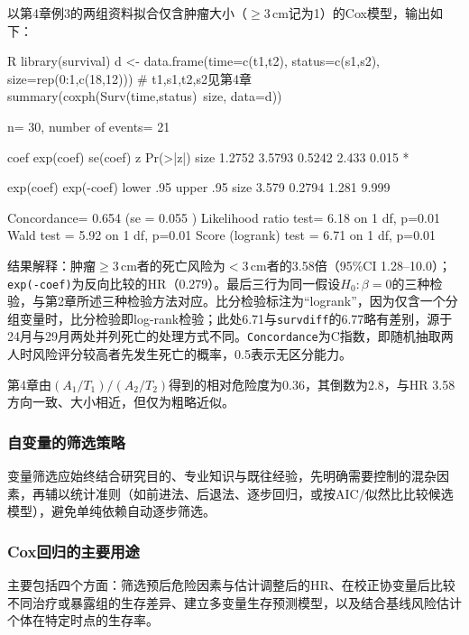 以第4章例3的两组资料拟合仅含肿瘤大小（$\geqslant3$\,cm记为1）的Cox模型，输出如下：
\par\noindent
\begin{coursecode}{R}
library(survival)
d <- data.frame(time=c(t1,t2), status=c(s1,s2), size=rep(0:1,c(18,12)))  # t1,s1,t2,s2见第4章
summary(coxph(Surv(time,status)~size, data=d))
\end{coursecode}
\begin{routput}
  n= 30, number of events= 21 

       coef exp(coef) se(coef)     z Pr(>|z|)  
size 1.2752    3.5793   0.5242 2.433    0.015 *

     exp(coef) exp(-coef) lower .95 upper .95
size     3.579     0.2794     1.281     9.999

Concordance= 0.654  (se = 0.055 )
Likelihood ratio test= 6.18  on 1 df,   p=0.01
Wald test            = 5.92  on 1 df,   p=0.01
Score (logrank) test = 6.71  on 1 df,   p=0.01
\end{routput}
结果解释：肿瘤$\geqslant3$\,cm者的死亡风险为$<3$\,cm者的3.58倍（95\%CI 1.28--10.0）；\texttt{exp(-coef)}为反向比较的HR（0.279）。最后三行为同一假设$H_0:\beta=0$的三种检验，与第2章所述三种检验方法对应。比分检验标注为“logrank”，因为仅含一个分组变量时，比分检验即log-rank检验；此处6.71与\texttt{survdiff}的6.77略有差别，源于24月与29月两处并列死亡的处理方式不同。\texttt{Concordance}为C指数，即随机抽取两人时风险评分较高者先发生死亡的概率，0.5表示无区分能力。

第4章由$(A_1/T_1)/(A_2/T_2)$得到的相对危险度为0.36，其倒数为2.8，与HR 3.58方向一致、大小相近，但仅为粗略近似。
\subsubsection{自变量的筛选策略}
变量筛选应始终结合研究目的、专业知识与既往经验，先明确需要控制的混杂因素，再辅以统计准则（如前进法、后退法、逐步回归，或按AIC/似然比比较候选模型），避免单纯依赖自动逐步筛选。
\subsubsection{Cox回归的主要用途}
主要包括四个方面：筛选预后危险因素与估计调整后的HR、在校正协变量后比较不同治疗或暴露组的生存差异、建立多变量生存预测模型，以及结合基线风险估计个体在特定时点的生存率。
